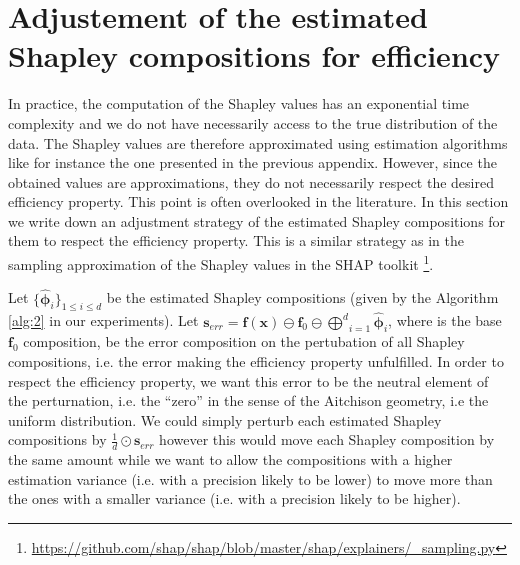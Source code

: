 \documentclass{article}
\theoremstyle{plain}
\theoremstyle{definition}
\theoremstyle{remark}
\begin{document}
\newpage
\section{Adjustement of the estimated Shapley compositions for efficiency}
\label{app:correct}

In practice, the computation of the Shapley values has an exponential time complexity and we do not have necessarily access to the true distribution of the data. The Shapley values are therefore approximated using estimation algorithms like for instance the one presented in the previous appendix. However, since the obtained values are approximations, they do not necessarily respect the desired efficiency property. This point is often overlooked in the literature. In this section we write down an adjustment strategy of the estimated Shapley compositions for them to respect the efficiency property. This is a similar strategy as in the sampling approximation of the Shapley values in the SHAP toolkit \cite{NIPS2017_7062}\footnote{\url{https://github.com/shap/shap/blob/master/shap/explainers/_sampling.py}}.

Let $\{\hat{\bm{\phi}}_i\}_{1\leq i \leq d}$ be the estimated Shapley compositions (given by the Algorithm \ref{alg:2} in our experiments). Let $\displaystyle \bm{s}_{err} = \bm{f}(\bm{x}) \ominus \bm{f}_0 \ominus \underset{i=1}{\overset{d}\bigoplus} \hat{\bm{\phi}}_i$, where is the base $\bm{f}_0$ composition, be the error composition on the pertubation of all Shapley compositions, i.e. the error making the efficiency property unfulfilled. In order to respect the efficiency property, we want this error to be the neutral element of the perturnation, i.e. the ``zero'' in the sense of the Aitchison geometry, i.e the uniform distribution. We could simply perturb each estimated Shapley compositions by $\frac{1}{d}\odot\bm{s}_{err}$ however this would move each Shapley composition by the same amount while we want to allow the compositions with a higher estimation variance (i.e. with a precision likely to be lower) to move more than the ones with a smaller variance (i.e. with a precision likely to be higher).
\end{document}
